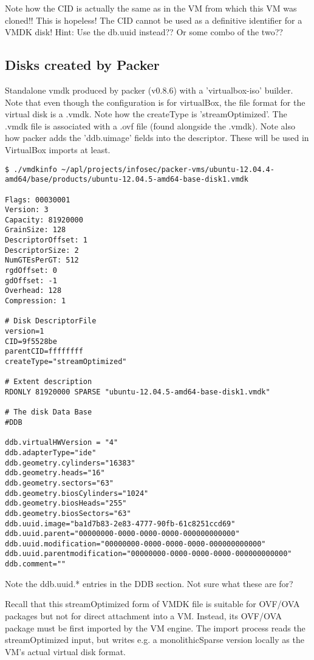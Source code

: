 \documentclass{article}
\begin{document}
Note how the CID is actually the same as in the VM from which this VM
was cloned!!  This is hopeless!  The CID cannot be used as a
definitive identifier for a VMDK disk!  Hint: Use the db.uuid
instead??  Or some combo of the two??

\subsection{Disks created by Packer}

Standalone vmdk produced by packer (v0.8.6) with a 'virtualbox-iso'
builder.  Note that even though the configuration is for virtualBox,
the file format for the virtual disk is a .vmdk.  Note how the
createType is 'streamOptimized'.  The .vmdk file is associated with a
.ovf file (found alongside the .vmdk).  Note also how packer adds the
'ddb.uimage' fields into the descriptor.  These will be used in
VirtualBox imports at least.

\begin{verbatim}
$ ./vmdkinfo ~/apl/projects/infosec/packer-vms/ubuntu-12.04.4-amd64/base/products/ubuntu-12.04.5-amd64-base-disk1.vmdk 

Flags: 00030001
Version: 3
Capacity: 81920000
GrainSize: 128
DescriptorOffset: 1
DescriptorSize: 2
NumGTEsPerGT: 512
rgdOffset: 0
gdOffset: -1
Overhead: 128
Compression: 1

# Disk DescriptorFile
version=1
CID=9f5528be
parentCID=ffffffff
createType="streamOptimized"

# Extent description
RDONLY 81920000 SPARSE "ubuntu-12.04.5-amd64-base-disk1.vmdk"

# The disk Data Base 
#DDB

ddb.virtualHWVersion = "4"
ddb.adapterType="ide"
ddb.geometry.cylinders="16383"
ddb.geometry.heads="16"
ddb.geometry.sectors="63"
ddb.geometry.biosCylinders="1024"
ddb.geometry.biosHeads="255"
ddb.geometry.biosSectors="63"
ddb.uuid.image="ba1d7b83-2e83-4777-90fb-61c8251ccd69"
ddb.uuid.parent="00000000-0000-0000-0000-000000000000"
ddb.uuid.modification="00000000-0000-0000-0000-000000000000"
ddb.uuid.parentmodification="00000000-0000-0000-0000-000000000000"
ddb.comment=""
\end{verbatim}

Note the ddb.uuid.* entries in the DDB section.  Not sure what these
are for?

Recall that this streamOptimized form of VMDK file is suitable for
OVF/OVA packages but not for direct attachment into a VM.  Instead,
its OVF/OVA package must be first imported by the VM engine.  The
import process reads the streamOptimized input, but writes e.g. a
monolithicSparse version locally as the VM's actual virtual disk
format.
\end{document}
